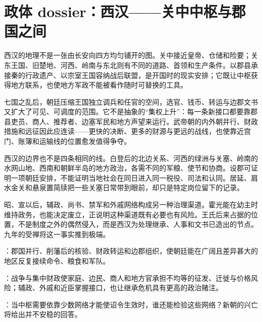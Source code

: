 \section{政体 dossier：西汉——关中中枢与郡国之间}
\label{sec:polity-western-han}

西汉的地理不是一张由长安向四方均匀铺开的图。关中接近皇帝、仓储和险要；关东王国、旧楚地、河西、岭南与东北则有不同的道路、首领和生产条件。以郡县承接秦的行政遗产、以宗室王国容纳战后联盟，是开国时的现实安排；它既让中枢获得地方联系，也使地方军政不能被看作随时可替换的工具。

七国之乱后，朝廷压缩王国独立调兵和任官的空间，选官、钱币、转运与边郡文书又扩大了可见、可调度的范围。它不是抽象的“集权上升”：每一条新接口都要靠郡县吏员、商人、推荐者、边塞军民和地方声望来运行。武帝朝的内外朝并行、财政措施和远征因此应连读——更快的决断、更多的财源与更远的战线，也使靠近宫门、账簿和运输线的位置愈发值得争夺。

西汉的边界也不是四条相同的线。白登后的北边关系、河西的绿洲与关塞、岭南的水网山地、西南和朝鲜半岛的地方政治，各需不同的军粮、使节和协商。设郡可证明一项朝廷安排，不能证明当地社会在同日进入同一税役、司法和认同。居延、肩水金关和悬泉置简牍把一些关塞日常带到眼前，却只是特定岗位留下的记录。

昭、宣以后，辅政、尚书、禁军和外戚网络构成另一种治理渠道。霍光能在幼主时维持政务，也能决定废立，正说明这种渠道既有必要也有风险。王氏后来占据的位置，不是制度之外的偶然侵入，而是西汉为处理继承、人事和文书已造出的节点。九年的受禅将这一事实推到极端。

\begin{turningpoint}[西汉政体的得失]
：郡国并行、削藩后的核验、财政转运和边郡组织，使朝廷能在广阔且差异甚大的地区反复接续命令、粮食和军队。

：战争与集中财政使家庭、边民、商人和地方官承担不均等的征发、迁徙与价格风险；辅政、外戚和近臣掌握接口，也让继承危机具有更高的政治赌注。

：当中枢需要依靠少数网络才能使诏令生效时，谁还能检验这些网络？新朝的兴亡将给出并不安稳的回答。
\end{turningpoint}
